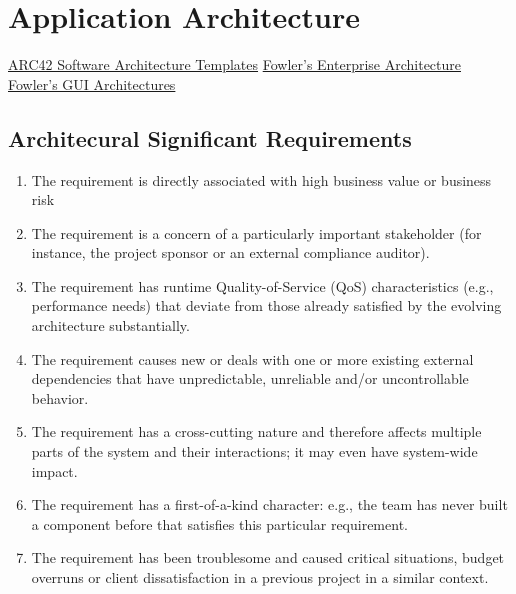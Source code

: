 \documentclass[../Main.tex]{subfiles}
\begin{document}
\chapter{Application Architecture}

\intro{

}


\href{https://arc42.org/overview}{ARC42 Software Architecture Templates}
\href{https://martinfowler.com/eaaCatalog/index.html}{Fowler's Enterprise Architecture}
\href{https://martinfowler.com/eaaDev/uiArchs.html}{Fowler's GUI Architectures}

\section{Architecural Significant Requirements}
\begin{enumerate}
    \item The requirement is directly associated with high business value or business risk
    \item The requirement is a concern of a particularly important stakeholder (for instance, the project sponsor or an external compliance auditor). 
    \item The requirement has runtime Quality-of-Service (QoS) characteristics (e.g., performance needs) that deviate from those already satisfied by the evolving architecture substantially.
    \item  The requirement causes new or deals with one or more existing external dependencies that have unpredictable, unreliable and/or uncontrollable behavior. 
    \item The requirement has a cross-cutting nature and therefore affects multiple parts of the system and their interactions; it may even have system-wide impact. 
    \item The requirement has a first-of-a-kind character: e.g., the team has never built a component before that satisfies this particular requirement. 
    \item The requirement has been troublesome and caused critical situations, budget overruns or client dissatisfaction in a previous project in a similar context. 
\end{enumerate}
\end{document}

